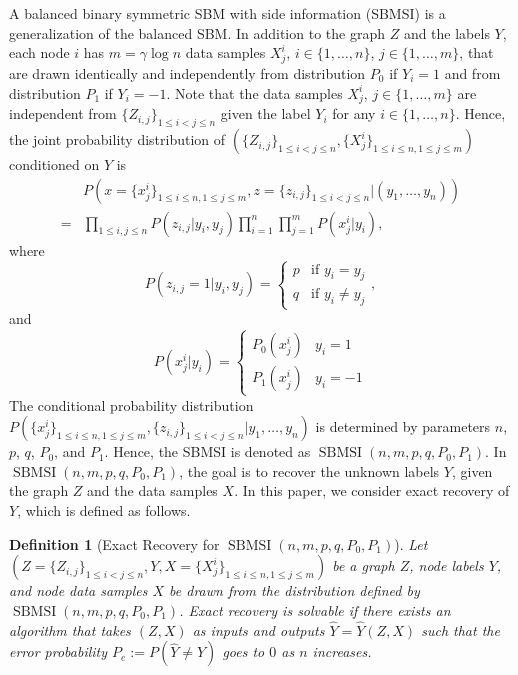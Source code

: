 \documentclass[conference]{IEEEtran}
\newtheorem{definition}{Definition}
\DeclareMathOperator{\SBMSI}{SBMSI}
\begin{document}
	
	A balanced binary symmetric SBM with side information (SBMSI) is a generalization of the balanced SBM. In addition to the graph $Z$ and the labels $Y$, each node $i$ has $m=\gamma \log n$ data samples $X^i_{j}$, $i\in \{1,\ldots,n\}$, $j\in \{1,\ldots,m\}$, that are drawn identically and independently from distribution $P_0$ if $Y_i=1$ and from distribution $P_1$ if $Y_i=-1$. Note that the data samples $X^i_{j}$, $j\in \{1,\ldots,m\}$ are independent from $\{Z_{i,j}\}_{1\le i<j\le n}$ given the label $Y_i$ for any $i\in\{1,\ldots,n\}$. Hence, the joint probability distribution of $(\{Z_{i,j}\}_{1\le i<j\le n},\{X^i_{j}\}_{1\le i\le n,1\le j\le m})$ conditioned on $Y$ is
	\begin{align}\label{eq:lh}
		&P(x=\{x^i_{j}\}_{1\le i\le n,1\le j\le m},z=\{z_{i,j}\}_{1\le i<j\le n}| (y_1,\ldots,y_n)) \nonumber\\
		=& \prod_{1\le i,j\le n}P(z_{i,j}|y_i,y_j)\prod_{i=1}^n \prod_{j=1}^m P(x^i_j|y_i), 
	\end{align}
	where 
	\begin{equation*}
		P  (z_{i,j}=1|y_i,y_j) = \begin{cases}
			p & \text{if } y_i=y_j \\
			q & \text{if } y_i\ne y_j
		\end{cases},
	\end{equation*}
	and
	\begin{equation*}
		P(x^i_j|y_i) = \begin{cases}
			P_0(x^i_j) & y_i = 1 \\
			P_1(x^i_j) & y_i = -1
		\end{cases}
	\end{equation*}
	The conditional probability distribution $P(\{x^i_{j}\}_{1\le i\le n,1\le j\le m},\{z_{i,j}\}_{1\le i<j\le n}| y_1,\ldots,y_n)$ is determined by parameters $n$, $p$, $q$, $P_0$, and $P_1$. Hence, 
	the SBMSI is denoted as $\SBMSI(n,m,p,q,P_0,P_1)$.
	In $\SBMSI(n,m,p,q,P_0,P_1)$, the goal is to recover the unknown labels $Y$, given the graph $Z$ and the data samples $X$. In this paper, we consider exact recovery of $Y$, which is defined as follows.
	\begin{definition}[Exact Recovery for $\SBMSI(n,m,p,q,P_0,P_1)$]
		Let
		$(Z=\{Z_{i,j}\}_{1\le i<j\le n},Y,X=\{X^i_{j}\}_{1\le i\le n,1\le j\le m})$ be a graph $Z$, node labels $Y$, and node data samples $X$ be drawn from the distribution defined by $\SBMSI(n,m,p,q,P_0,P_1)$.
		Exact recovery is solvable if there exists an algorithm that takes $(Z,X)$ as inputs and outputs $\hat{Y}=\hat{Y}(Z,X)$ such that the error probability $P_e:=P(\hat{Y} \neq Y)$ goes to $0$ as $n$ increases.
	\end{definition}
\end{document}
